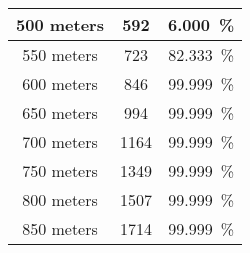 \begin{table}[H]
\begin{tabular}{|c|c|c|}
        500 meters         & 592   & 6.000~\%        \\\hline %
        550 meters         & 723   & 82.333~\%    \\\hline %
        600 meters         & 846   & 99.999~\%   \\\hline %
        650 meters         & 994   & 99.999~\%   \\\hline %
        700 meters         & 1164  & 99.999~\%   \\\hline %
        750 meters         & 1349  & 99.999~\%   \\\hline %
        800 meters         & 1507  & 99.999~\%   \\\hline %
        850 meters         & 1714  & 99.999~\%   \\\hline %

\end{tabular}
\end{table}
